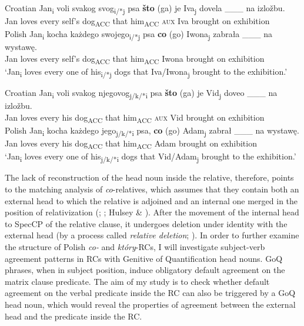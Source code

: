 \documentclass[output=paper]{langsci/langscibook}
\begin{document}
\ea%
    \label{ex:leska:15}
    \ea    Croatian
      \gll Jan\textsubscript{i} voli   svakog   svog\textsubscript{i/*j} psa   \textbf{što} (ga)   je   Iva\textsubscript{j} dovela \_\_\_ na izložbu. \\
           \textsubscript{} Jan   loves   every   self’s   dog\textsubscript{ACC}  that  him\textsubscript{ACC}  \textsc{aux}  Iva   brought on exhibition  \\
      \ex   Polish
      \gll  Jan\textsubscript{i} kocha   każdego   swojego\textsubscript{i/*j} psa   \textbf{co}   (go)   Iwona\textsubscript{j}    zabrała \_\_\_   na wystawę.       \\
            Jan   loves   every   self’s   dog\textsubscript{ACC}   that  him\textsubscript{ACC}  Iwona    brought   on exhibition         \\
      \glt  ‘Jan\textsubscript{i} loves every one of his\textsubscript{i/*j} dogs that Iva/Iwona\textsubscript{j} brought to the exhibition.’   
    \z
\z



\ea%
    \label{ex:leska:16}
    \ea  Croatian
    \gll Jan\textsubscript{i}  voli   svakog   njegovog\textsubscript{j/k/*i} psa   \textbf{što} (ga)   je   Vid\textsubscript{j}  doveo \_\_\_   na izložbu.   \\
         Jan   loves every   his   dog\textsubscript{ACC}  that him\textsubscript{ACC} \textsc{aux}  Vid                               brought   on exhibition \\
    \ex  Polish
    \gll Jan\textsubscript{i} kocha   każdego   jego\textsubscript{j/k/*i} psa,   \textbf{co}  (go)     Adam\textsubscript{j}   zabrał \_\_\_     na wystawę.\\
         Jan  loves   every   his   dog\textsubscript{ACC}  that  him\textsubscript{ACC}  Adam     brought   on exhibition    \\
    \glt ‘Jan\textsubscript{i} loves every one of his\textsubscript{j/k/*i} dogs that Vid/Adam\textsubscript{j} brought to the exhibition.’
    \z
\z

The lack of reconstruction of the head noun inside the relative, therefore, points to the matching analysis of \textit{co}{}-relatives, which assumes that they contain both an external head to which the relative is adjoined and an internal one merged in the position of relativization (\citealt{Bhatt2002}; \citealt{Sauerland2002}; Hulsey \& \citealt{Sauerland2006}). After the movement of the internal head to SpecCP of the relative clause, it undergoes deletion under identity with the external head (by a process called \textit{relative deletion}; \citealt{Sauerland2002}). In order to further examine the structure of Polish \textit{co{}-} and \textit{który}{}-RCs, I will investigate subject-verb agreement patterns in RCs with Genitive of Quantification head nouns. GoQ phrases, when in subject position, induce obligatory default agreement on the matrix clause predicate. The aim of my study is to check whether default agreement on the verbal predicate inside the RC can also be triggered by a GoQ head noun, which would reveal the properties of agreement between the external head and the predicate inside the RC.
\end{document}
